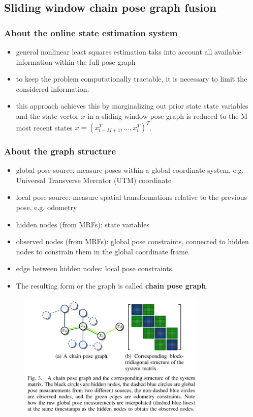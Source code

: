 \documentclass[letterpaper,11pt]{article}
\begin{document}
\subsection{Sliding window chain pose graph fusion}

\subsubsection{About the online state estimation system}

\begin{itemize}
	\item general nonlinear least squares estimation taks into account all available information within the full pose graph
	\item to keep the problem computationally tractable, it is necessary to limit the considered information.
	\item this approach achieves this by marginalizing out prior state state variables and the state vector $x$ in a sliding window pose graph is reduced to the M most recent states $x=(x_{t-M+1}^T,...,x_t^T)^T$.
\end{itemize}

\subsubsection{About the graph structure}

\begin{itemize}
	\item global pose source: measure poses within a global coordinate system, e.g. Universal Transverse Mercator (UTM) coordinate
	\item local pose source:  measure spatial transformations relative to the previous pose, e.g. odometry
	\item hidden nodes (from MRFs): state variables
	\item observed nodes (from MRFs): global pose constraints, connected to hidden nodes to constrain them in the global coordinate frame.
	\item edge between hidden nodes: local pose constraints.
	\item The resulting form or the graph is called \textbf{chain pose graph}.
\end{itemize}

\begin{figure}[!ht]
	\centering
	\includegraphics[width=0.8\textwidth]{./img/posegraph.png}
\end{figure}
\end{document}
